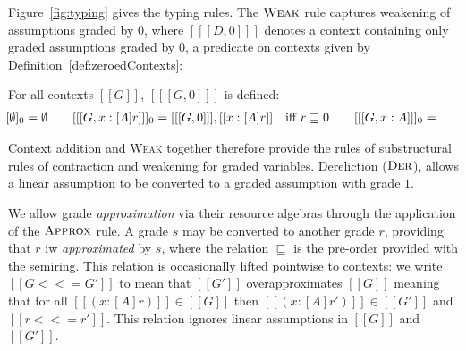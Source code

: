 Figure~\ref{fig:typing} gives the typing rules. The $\textsc{Weak}$ rule
captures weakening of assumptions graded by $0$, where $[[ [ D , 0 ] ]]$ denotes
a context containing only graded assumptions graded by $0$, a predicate on
contexts given by Definition~\ref{def:zeroedContexts}: 
\begin{definition}
  \label{def:zeroedContexts}
  For all contexts $[[ G ]]$, $ [[ [ G, 0 ] ]]$ is defined:
\begin{align*}
    \hspace{-0.9em}
    [ \emptyset ]_0 = \emptyset
    \qquad
    [[ [ {G, x : [A] r} ] ]]_0 = [[ [ G, 0 ] ]], [[ {x : [ A ] r} ]] \quad \text{iff}\ r \sqsupseteq 0
    \qquad
   [[ [ G, x : A ] ]]_0 =\ \perp
\end{align*}
\end{definition}

Context addition and \textsc{Weak} together therefore provide the rules of
substructural rules of contraction and weakening for graded variables.
Dereliction ($\textsc{Der}$), allows a linear assumption to be converted to a
graded assumption with grade $1$. 

We allow grade \textit{approximation} via their resource algebras through the
application of the $\textsc{Approx}$ rule. A grade $s$ may be converted to
another grade $r$, providing that $r$ iw \textit{approximated} by $s$, where the
relation $\sqsubseteq$ is the pre-order provided with the semiring. This
relation is occasionally lifted pointwise to contexts: we write $[[ G <<= G' ]]$
to mean that $[[ G' ]]$ overapproximates $[[ G ]]$ meaning that for all $[[ (x :
[A] r) ]] \in [[ G ]]$ then $[[ (x : [A] r') ]] \in [[ G' ]]$ and $[[ r <<= r'
]]$. This relation ignores linear assumptions in $[[G]]$ and $[[G']]$.

